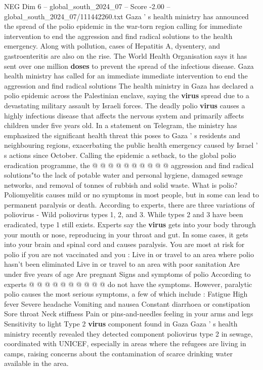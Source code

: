 \begin{textsample}{NEG Dim 6 – global\_south\_2024\_07 – Score -2.00 – global\_south\_2024\_07/111442260.txt}  \label{ex:f6_neg_128}
Gaza ' s health ministry has announced the spread of the polio epidemic in the war-torn region calling for immediate intervention to end the aggression and find radical solutions to the health emergency.
Along with pollution, cases of Hepatitis A, dysentery, and gastroenteritis are also on the rise.
The World Health Organisation says it has sent over one million \textbf{doses} to prevent the spread of the infectious disease.
Gaza health ministry has called for an immediate immediate intervention to end the aggression and find radical solutions The health ministry in Gaza has declared a polio epidemic across the Palestinian enclave, saying the \textbf{virus} spread due to a devastating military assault by Israeli forces.
The deadly polio \textbf{virus} causes a highly infectious disease that affects the nervous system and primarily affects children under five years old.
In a statement on Telegram, the ministry has emphasized the significant health threat this poses to Gaza ' s residents and neighbouring regions, exacerbating the public health emergency caused by Israel ' s actions since October.
Calling the epidemic a setback, to the global polio eradication programme, the @ @ @ @ @ @ @ @ @ @ aggression and find radical solutions"to the lack of potable water and personal hygiene, damaged sewage networks, and removal of tonnes of rubbish and solid waste.
What is polio?
Poliomyelitis causes mild or no symptoms in most people, but in some can lead to permanent paralysis or death.
According to experts, there are three variations of poliovirus - Wild poliovirus types 1, 2, and 3.
While types 2 and 3 have been eradicated, type 1 still exists.
Experts say the \textbf{virus} gets into your body through your mouth or nose, reproducing in your throat and gut.
In some cases, it gets into your brain and spinal cord and causes paralysis.
You are most at risk for polio if you are not vaccinated and you : Live in or travel to an area where polio hasn't been eliminated Live in or travel to an area with poor sanitation Are under five years of age Are pregnant Signs and symptoms of polio According to experts @ @ @ @ @ @ @ @ @ @ do not have the symptoms.
However, paralytic polio causes the most serious symptoms, a few of which include : Fatigue High fever Severe headache Vomiting and nausea Constant diarrhoea or constipation Sore throat Neck stiffness Pain or pins-and-needles feeling in your arms and legs Sensitivity to light Type 2 \textbf{virus} component found in Gaza Gaza ' s health ministry recently revealed they detected component poliovirus type 2 in sewage, coordinated with UNICEF, especially in areas where the refugees are living in camps, raising concerns about the contamination of scarce drinking water available in the area.

\end{textsample}
